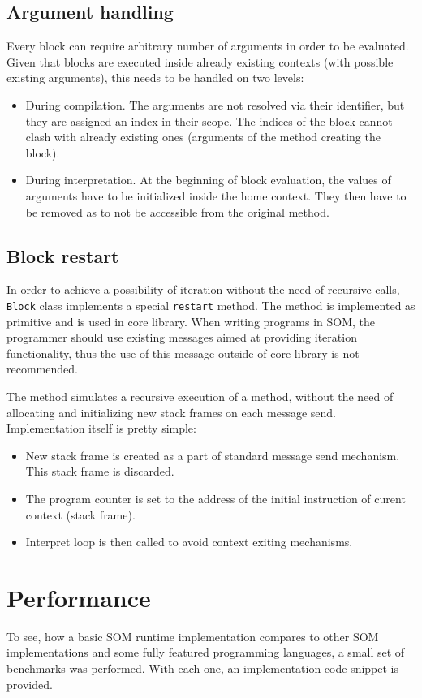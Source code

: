 \documentclass[thesis=M,english]{FITthesis}[2019/12/23]
\begin{document}
\subsection{Argument handling}
Every block can require arbitrary number of arguments in order to be evaluated. Given that blocks are executed inside already existing
contexts (with possible existing arguments), this needs to be handled on two levels:
\begin{itemize}
	\item During compilation. The arguments are not resolved via their identifier, but they are assigned an index in their scope.
		The indices of the block cannot clash with already existing ones (arguments of the method creating the block).
	\item During interpretation. At the beginning of block evaluation, the values of arguments have to be initialized inside the home context.
		They then have to be removed as to not be accessible from the original method.
\end{itemize}

\subsection{Block restart}
In order to achieve a possibility of iteration without the need of recursive calls, \texttt{Block} class implements a special \texttt{restart} method.
The method is implemented as primitive and is used in core library. When writing programs in SOM, the programmer should use existing messages aimed at
providing iteration functionality, thus the use of this message outside of core library is not recommended.

The method simulates a recursive execution of a method, without the need of allocating and initializing new stack frames on each message send.
Implementation itself is pretty simple:
\begin{itemize}
	\item New stack frame is created as a part of standard message send mechanism. This stack frame is discarded.
	\item The program counter is set to the address of the initial instruction of curent context (stack frame).
	\item Interpret loop is then called to avoid context exiting mechanisms.
\end{itemize}

\section{Performance}
To see, how a basic SOM runtime implementation compares to other SOM implementations and some fully featured programming languages, a small set of
benchmarks was performed. With each one, an implementation code snippet is provided.
\end{document}
